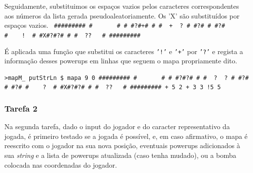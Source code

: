 \documentclass[a4paper]{article}
\begin{document}
    Seguidamente, substituimos os espaços vazios pelos caracteres correspondentes aos números da lista
    gerada pseudoaleatoriamente. Os 'X' são substituídos por espaços vazios.\hspace{10cm}
        \linebreak
        \texttt{
        \linebreak \#\#\#\#\#\#\#\#\#
        \linebreak \# \ \  \ \ \ \ \#
        \linebreak \# \#?\#+\# \#
        \linebreak \#\ \ +\ \ ?\ \#
        \linebreak \#?\# \# \#?\#
        \linebreak \#\ \ \ \ !\ \ \#
        \linebreak \#X\#?\#?\# \#
        \linebreak \# \ ??\ \ \ \#
        \linebreak \#\#\#\#\#\#\#\#\#}
        \linebreak
    
     É aplicada uma função que substitui os caracteres \texttt{'!'} e \texttt{'+'} por \texttt{'?'} e regista a informação desses powerups em linhas que seguem o mapa propriamente dito.\hspace{10cm}
        \linebreak
        
        \texttt{>mapM\_ putStrLn \$ mapa 9 0
        \linebreak \#\#\#\#\#\#\#\#\#
        \linebreak \# \ \  \ \ \ \ \#
        \linebreak \# \#?\#?\# \#
        \linebreak \#\ \ ?\ \ ?\ \#
        \linebreak \#?\# \# \#?\#
        \linebreak \#\ \ \ \ ?\ \ \#
        \linebreak \#X\#?\#?\# \#
        \linebreak \# \ ??\ \ \ \#
        \linebreak \#\#\#\#\#\#\#\#\#
        \linebreak + 5 2
        \linebreak + 3 3
        \linebreak !\hspace{0.20cm}5 5}
        
        
\pagebreak

\subsubsection{Tarefa 2}
\hspace{0.54cm}Na segunda tarefa, dado o input do jogador e do caracter representativo da jogada, é primeiro testado 
    se a jogada é possível, e, em caso afirmativo, o mapa é reescrito com o jogador na sua nova posição, 
    eventuais powerups adicionados à sua \textit{string} e 
    a lista de powerups atualizada (caso tenha mudado), ou a bomba colocada nas coordenadas do jogador.
    \hspace{10cm}
    \linebreak
    
\end{document}
